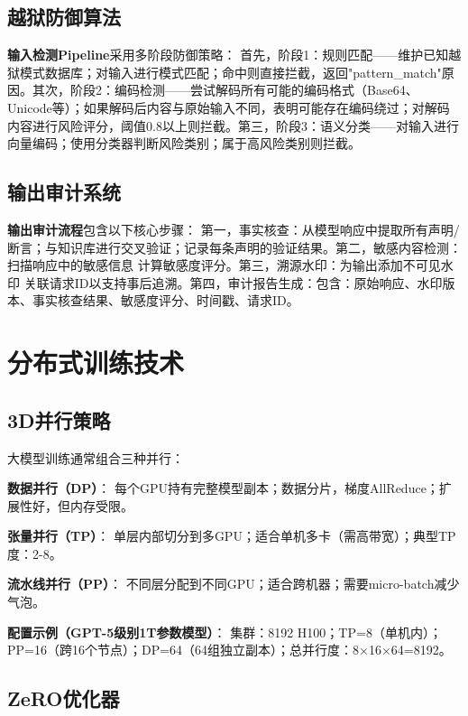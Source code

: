 \subsection{越狱防御算法}

\textbf{输入检测Pipeline}采用多阶段防御策略：
首先，阶段1：规则匹配——维护已知越狱模式数据库；对输入进行模式匹配；命中则直接拦截，返回"pattern\_match"原因。其次，阶段2：编码检测——尝试解码所有可能的编码格式（Base64、Unicode等）；如果解码后内容与原始输入不同，表明可能存在编码绕过；对解码内容进行风险评分，阈值0.8以上则拦截。第三，阶段3：语义分类——对输入进行向量编码；使用分类器判断风险类别；属于高风险类别则拦截。

\subsection{输出审计系统}

\textbf{输出审计流程}包含以下核心步骤：
第一，事实核查：从模型响应中提取所有声明/断言；与知识库进行交叉验证；记录每条声明的验证结果。第二，敏感内容检测：扫描响应中的敏感信息 计算敏感度评分。第三，溯源水印：为输出添加不可见水印 关联请求ID以支持事后追溯。第四，审计报告生成：包含：原始响应、水印版本、事实核查结果、敏感度评分、时间戳、请求ID。

\section{分布式训练技术}

\subsection{3D并行策略}

大模型训练通常组合三种并行\cite{narayanan2024efficient}：

\textbf{数据并行（DP）}：
每个GPU持有完整模型副本；数据分片，梯度AllReduce；扩展性好，但内存受限。

\textbf{张量并行（TP）}：
单层内部切分到多GPU；适合单机多卡（需高带宽）；典型TP度：2-8。

\textbf{流水线并行（PP）}：
不同层分配到不同GPU；适合跨机器；需要micro-batch减少气泡。

\textbf{配置示例（GPT-5级别1T参数模型）}：
集群：8192 H100；TP=8（单机内）；PP=16（跨16个节点）；DP=64（64组独立副本）；总并行度：8×16×64=8192。

\subsection{ZeRO优化器}

